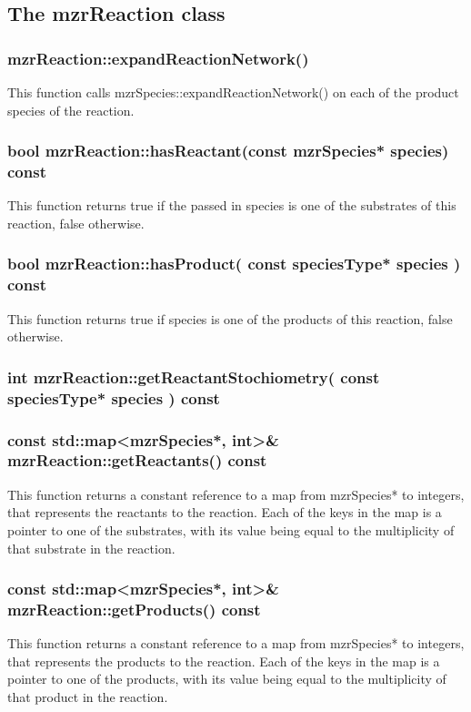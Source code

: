 \subsection{The mzrReaction class}
\subsubsection{mzrReaction::expandReactionNetwork()}
This function calls mzrSpecies::expandReactionNetwork() on each of the
product species of the reaction.

\subsubsection{bool mzrReaction::hasReactant(const mzrSpecies*
  species) const}
This function returns true if the passed in species is one of the
substrates of this reaction, false otherwise.  

\subsubsection{bool mzrReaction::hasProduct( const speciesType*
  species ) const}
This function returns true if species is one of the products of this
reaction, false otherwise.  

\subsubsection{int mzrReaction::getReactantStochiometry( const
  speciesType* species ) const}

\subsubsection{const std::map<mzrSpecies*, int>\& mzrReaction::getReactants() const}
This function returns a constant reference to a map from mzrSpecies*
to integers, that represents the reactants to the reaction.  Each
of the keys in the map is a pointer to one of the substrates, with its
value being equal to the multiplicity of that substrate in the reaction.

\subsubsection{const std::map<mzrSpecies*, int>\&
  mzrReaction::getProducts() const}
This function returns a constant reference to a map from mzrSpecies*
to integers, that represents the products to the reaction.  Each
of the keys in the map is a pointer to one of the products, with its
value being equal to the multiplicity of that product in the reaction.

